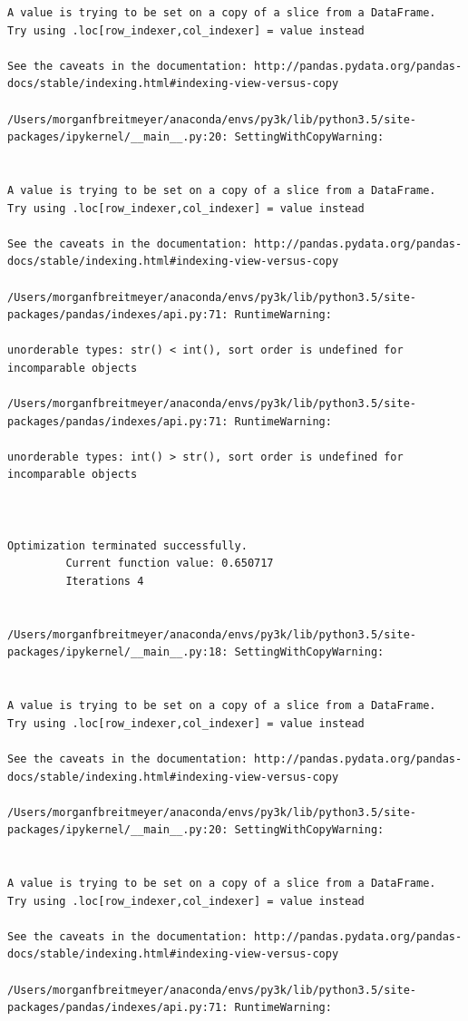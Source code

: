 \begin{lstlisting}
A value is trying to be set on a copy of a slice from a DataFrame.
Try using .loc[row_indexer,col_indexer] = value instead

See the caveats in the documentation: http://pandas.pydata.org/pandas-docs/stable/indexing.html#indexing-view-versus-copy

/Users/morganfbreitmeyer/anaconda/envs/py3k/lib/python3.5/site-packages/ipykernel/__main__.py:20: SettingWithCopyWarning:


A value is trying to be set on a copy of a slice from a DataFrame.
Try using .loc[row_indexer,col_indexer] = value instead

See the caveats in the documentation: http://pandas.pydata.org/pandas-docs/stable/indexing.html#indexing-view-versus-copy

/Users/morganfbreitmeyer/anaconda/envs/py3k/lib/python3.5/site-packages/pandas/indexes/api.py:71: RuntimeWarning:

unorderable types: str() < int(), sort order is undefined for incomparable objects

/Users/morganfbreitmeyer/anaconda/envs/py3k/lib/python3.5/site-packages/pandas/indexes/api.py:71: RuntimeWarning:

unorderable types: int() > str(), sort order is undefined for incomparable objects



Optimization terminated successfully.
         Current function value: 0.650717
         Iterations 4


/Users/morganfbreitmeyer/anaconda/envs/py3k/lib/python3.5/site-packages/ipykernel/__main__.py:18: SettingWithCopyWarning:


A value is trying to be set on a copy of a slice from a DataFrame.
Try using .loc[row_indexer,col_indexer] = value instead

See the caveats in the documentation: http://pandas.pydata.org/pandas-docs/stable/indexing.html#indexing-view-versus-copy

/Users/morganfbreitmeyer/anaconda/envs/py3k/lib/python3.5/site-packages/ipykernel/__main__.py:20: SettingWithCopyWarning:


A value is trying to be set on a copy of a slice from a DataFrame.
Try using .loc[row_indexer,col_indexer] = value instead

See the caveats in the documentation: http://pandas.pydata.org/pandas-docs/stable/indexing.html#indexing-view-versus-copy

/Users/morganfbreitmeyer/anaconda/envs/py3k/lib/python3.5/site-packages/pandas/indexes/api.py:71: RuntimeWarning:


\end{lstlisting}
